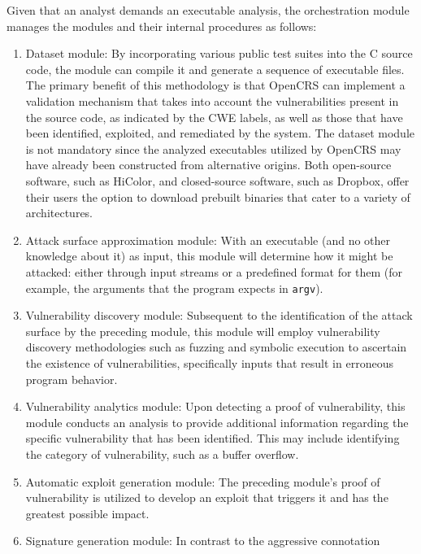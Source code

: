 \documentclass[../main.tex]{subfiles}
\begin{document}
Given that an analyst demands an executable analysis, the orchestration
module manages the modules and their internal procedures as follows:

\begin{enumerate}
\def\labelenumi{\arabic{enumi}.}
\tightlist
\item
  Dataset module: By incorporating various public test suites into the C
  source code, the module can compile it and generate a sequence of
  executable files. The primary benefit of this methodology is that
  OpenCRS can implement a validation mechanism that takes into account
  the vulnerabilities present in the source code, as indicated by the
  CWE labels, as well as those that have been identified, exploited, and
  remediated by the system. The dataset module is not mandatory since
  the analyzed executables utilized by OpenCRS may have already been
  constructed from alternative origins. Both open-source software, such
  as HiColor, and closed-source software, such as Dropbox, offer their
  users the option to download prebuilt binaries that cater to a variety
  of architectures.
\item
  Attack surface approximation module: With an executable (and no other
  knowledge about it) as input, this module will determine how it might
  be attacked: either through input streams or a predefined format for
  them (for example, the arguments that the program expects in
  \texttt{argv}).
\item
  Vulnerability discovery module: Subsequent to the identification of
  the attack surface by the preceding module, this module will employ
  vulnerability discovery methodologies such as fuzzing and symbolic
  execution to ascertain the existence of vulnerabilities, specifically
  inputs that result in erroneous program behavior.
\item
  Vulnerability analytics module: Upon detecting a proof of
  vulnerability, this module conducts an analysis to provide additional
  information regarding the specific vulnerability that has been
  identified. This may include identifying the category of
  vulnerability, such as a buffer overflow.
\item
  Automatic exploit generation module: The preceding module's proof of
  vulnerability is utilized to develop an exploit that triggers it and
  has the greatest possible impact.
\item
  Signature generation module: In contrast to the aggressive connotation

\end{enumerate}
\end{document}
